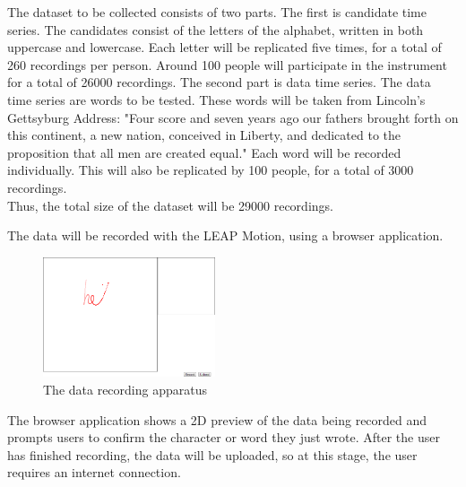The dataset to be collected consists of two parts.
The first is candidate time series. The candidates consist of the letters of the alphabet, written in both uppercase and lowercase. Each letter will be replicated five times, for a total of 260 recordings per person. Around 100 people will participate in the instrument for a total of 26000 recordings.
The second part is data time series. The data time series are words to be tested. These words will be taken from Lincoln's Gettsyburg Address: "Four score and seven years ago our fathers brought forth on this continent, a new nation, conceived in Liberty, and dedicated to the proposition that all men are created equal." Each word will be recorded individually. This will also be replicated by 100 people, for a total of 3000 recordings.
\\[1\baselineskip]
Thus, the total size of the dataset will be 29000 recordings.

The data will be recorded with the LEAP Motion, using a browser application. 

\begin{figure}
  \begin{center}
  \includegraphics[width=2in]{images/recording-1-cropped.PNG}
  \caption{The data recording apparatus}
  \label{fig:teaser}
  \end{center}  
\end{figure}

The browser application shows a 2D preview of the data being recorded and prompts users to confirm the character or word they just wrote.
After the user has finished recording, the data will be uploaded, so at this stage, the user requires an internet connection.
